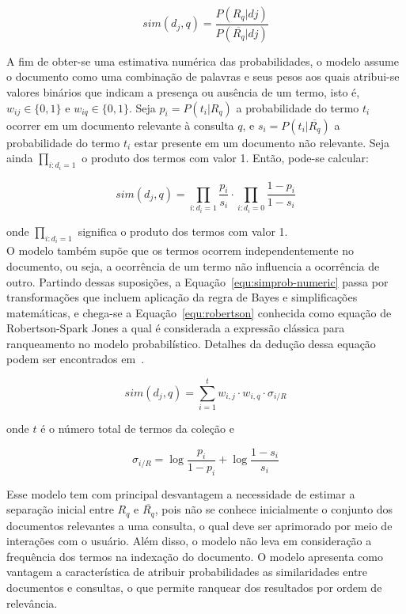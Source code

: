 \begin{equation}
	sim(d_j, q) = \frac{P(R_q|dj)}{P(\overline{R_q}|dj)} 
	\label{equ:simprob}
\end{equation}


A fim de obter-se uma estimativa numérica das probabilidades, o modelo assume o documento como uma combinação de palavras e seus pesos aos quais atribui-se valores binários que indicam a presença ou ausência de um termo, isto é, $w_{ij} \in \{0,1\}$ e $w_{iq} \in \{0,1\}$. Seja $p_i = P(t_i|R_q)$ a probabilidade do termo $t_i$ ocorrer em um documento relevante à consulta $q$, e $s_i    = P(t_i|\overline{R_q})$ a probabilidade do termo $t_i$ estar presente em um documento não relevante. 
Seja ainda $\prod_{i:d_i=1}$ o produto dos termos com valor 1. 
Então, pode-se calcular:

\begin{equation}
	sim(d_j, q) = 	
	\prod_{i:d_i=1} \frac{p_i}{s_i} 
	\cdot
	\prod_{i:d_i=0} \frac{1 - p_i}{1 - s_i}
	\label{equ:simprob-numeric}
\end{equation}


\noindent
onde $\prod_{i:d_i=1}$ significa o produto dos termos com valor 1.\\


%
%
O modelo também supõe que os termos ocorrem independentemente no documento, ou seja, a ocorrência de um termo não influencia a ocorrência de outro. 
Partindo dessas suposições, a Equação~\ref{equ:simprob-numeric} passa por transformações que incluem aplicação da regra de Bayes e simplificações matemáticas, e chega-se a Equação~\ref{equ:robertson} conhecida como equação de Robertson-Spark Jones a qual é considerada a expressão clássica para ranqueamento no modelo probabilístico. Detalhes da dedução dessa equação podem ser encontrados em~\cite{Croft2009, Manning2008, Rijsbergen1979}.



\begin{equation}
	sim(d_j,q) = \sum_{i=1}^{t} w_{i,j} \cdot w_{i,q}  \cdot \sigma_{i/R}
	\label{equ:robertson}
\end{equation}

\noindent
onde $t$ é o número total de termos da coleção e 

\begin{equation}
	\sigma_{i/R} = \log \frac{p_i}{1-p_i} + \log \frac{1-s_i}{s_i}
\end{equation}


Esse modelo tem com principal desvantagem a necessidade de estimar a separação inicial entre $R_q$ e $\overline{R_q}$, pois não se conhece inicialmente o conjunto dos documentos relevantes a uma consulta, o qual deve ser aprimorado por meio de interações com o usuário. Além disso, o modelo não leva em consideração a frequência dos termos na indexação do documento. O modelo apresenta como vantagem a característica de atribuir probabilidades as similaridades entre documentos e consultas, o que permite ranquear dos resultados por ordem de relevância. 












